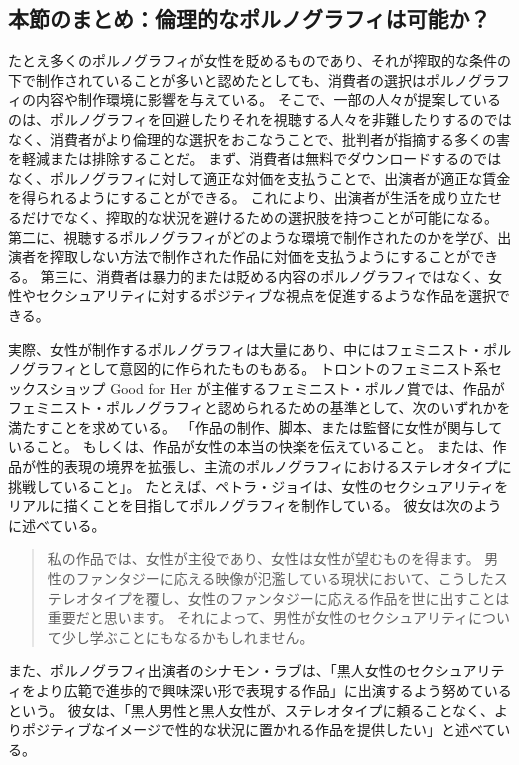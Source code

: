 \documentclass[paper=a4,book,openany]{jlreq}
\begin{document}
\subsection{本節のまとめ：倫理的なポルノグラフィは可能か？}

たとえ多くのポルノグラフィが女性を貶めるものであり、それが搾取的な条件の下で制作されていることが多いと認めたとしても、消費者の選択はポルノグラフィの内容や制作環境に影響を与えている。
そこで、一部の人々が提案しているのは、ポルノグラフィを回避したりそれを視聴する人々を非難したりするのではなく、消費者がより倫理的な選択をおこなうことで、批判者が指摘する多くの害を軽減または排除することだ。
まず、消費者は無料でダウンロードするのではなく、ポルノグラフィに対して適正な対価を支払うことで、出演者が適正な賃金を得られるようにすることができる。
これにより、出演者が生活を成り立たせるだけでなく、搾取的な状況を避けるための選択肢を持つことが可能になる。
第二に、視聴するポルノグラフィがどのような環境で制作されたのかを学び、出演者を搾取しない方法で制作された作品に対価を支払うようにすることができる。
第三に、消費者は暴力的または貶める内容のポルノグラフィではなく、女性やセクシュアリティに対するポジティブな視点を促進するような作品を選択できる。

実際、女性が制作するポルノグラフィは大量にあり、中にはフェミニスト・ポルノグラフィとして意図的に作られたものもある。
トロントのフェミニスト系セックスショップ Good for Her が主催するフェミニスト・ポルノ賞では、作品がフェミニスト・ポルノグラフィと認められるための基準として、次のいずれかを満たすことを求めている。
「作品の制作、脚本、または監督に女性が関与していること。
もしくは、作品が女性の本当の快楽を伝えていること。
または、作品が性的表現の境界を拡張し、主流のポルノグラフィにおけるステレオタイプに挑戦していること」\citep{lust11:_what_is_your_defin_femin_porn}。
たとえば、ペトラ・ジョイは、女性のセクシュアリティをリアルに描くことを目指してポルノグラフィを制作している。
彼女は次のように述べている。

\begin{quote}
私の作品では、女性が主役であり、女性は女性が望むものを得ます。
男性のファンタジーに応える映像が氾濫している現状において、こうしたステレオタイプを覆し、女性のファンタジーに応える作品を世に出すことは重要だと思います。
それによって、男性が女性のセクシュアリティについて少し学ぶことにもなるかもしれません。
\citep{smith14:_porn_produc}
\end{quote}

また、ポルノグラフィ出演者のシナモン・ラブは、「黒人女性のセクシュアリティをより広範で進歩的で興味深い形で表現する作品」に出演するよう努めているという。
彼女は、「黒人男性と黒人女性が、ステレオタイプに頼ることなく、よりポジティブなイメージで性的な状況に置かれる作品を提供したい」と述べている\citep{love13:_quest_femin}。
\end{document}
